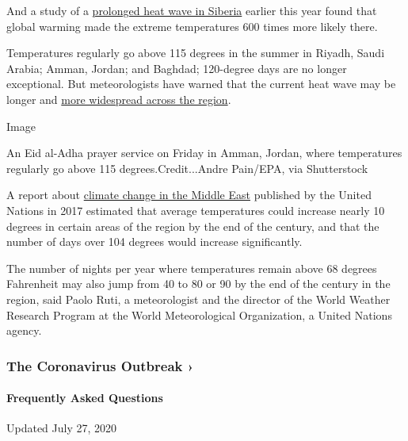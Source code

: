 And a study of a
\href{https://www.nytimes3xbfgragh.onion/2020/07/15/climate/siberia-heat-wave-climate-change.html}{prolonged
heat wave in Siberia} earlier this year found that global warming made
the extreme temperatures 600 times more likely there.

Temperatures regularly go above 115 degrees in the summer in Riyadh,
Saudi Arabia; Amman, Jordan; and Baghdad; 120-degree days are no longer
exceptional. But meteorologists have warned that the current heat wave
may be longer and
\href{https://public.wmo.int/en/media/news/above-normal-temperatures-likely-over-arab-region}{more
widespread across the region}.

Image

An Eid al-Adha prayer service on Friday in Amman, Jordan, where
temperatures regularly go above 115 degrees.Credit...Andre Pain/EPA, via
Shutterstock

A report about
\href{https://www.unescwa.org/sites/www.unescwa.org/files/events/files/riccar_main_report_2017.pdf}{climate
change in the Middle East} published by the United Nations in 2017
estimated that average temperatures could increase nearly 10 degrees in
certain areas of the region by the end of the century, and that the
number of days over 104 degrees would increase significantly.

The number of nights per year where temperatures remain above 68 degrees
Fahrenheit may also jump from 40 to 80 or 90 by the end of the century
in the region, said Paolo Ruti, a meteorologist and the director of the
World Weather Research Program at the World Meteorological Organization,
a United Nations agency.

\href{https://www.nytimes3xbfgragh.onion/news-event/coronavirus?action=click\&pgtype=Article\&state=default\&region=MAIN_CONTENT_3\&context=storylines_faq}{}

\hypertarget{the-coronavirus-outbreak-}{%
\subsubsection{The Coronavirus Outbreak
›}\label{the-coronavirus-outbreak-}}

\hypertarget{frequently-asked-questions}{%
\paragraph{Frequently Asked
Questions}\label{frequently-asked-questions}}

Updated July 27, 2020


